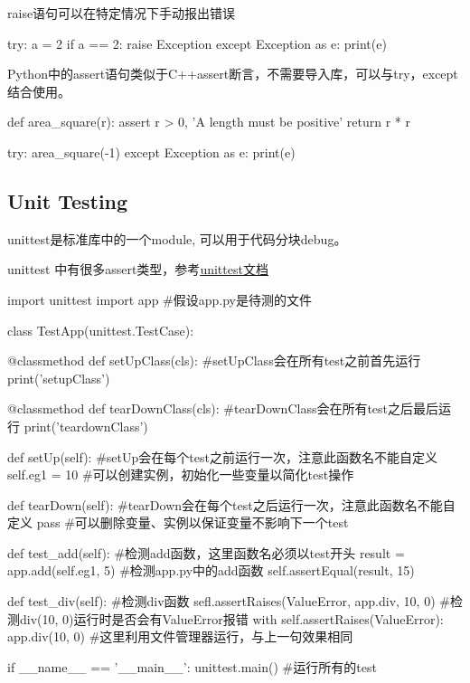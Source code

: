     raise语句可以在特定情况下手动报出错误
    \begin{codeblock}[language=python, caption={Raise an error}]
      try:
          a = 2
          if a == 2:
              raise Exception
      except Exception as e:
          print(e)
    \end{codeblock}

    Python中的assert语句类似于C++assert断言，不需要导入库，可以与try，except结合使用。
    \begin{codeblock}[language=python, caption={assert in python}]
      def area_square(r):
          assert r > 0, 'A length must be positive'
          return r * r

      try:
          area_square(-1)
      except Exception as e:
          print(e)
    \end{codeblock}

  \subsection{Unit Testing}
    unittest是标准库中的一个module, 可以用于代码分块debug。 
    
    unittest 中有很多assert类型，参考\href{https://docs.python.org/3/library/unittest.html#module-unittest}{\underline{unittest文档}}
    \begin{codeblock}[language=python, caption={Unit Testing}]
      import unittest
      import app #假设app.py是待测的文件

      class TestApp(unittest.TestCase):

          @classmethod
          def setUpClass(cls): #setUpClass会在所有test之前首先运行
              print('setupClass')

          @classmethod
          def tearDownClass(cls): #tearDownClass会在所有test之后最后运行
              print('teardownClass')

          def setUp(self): #setUp会在每个test之前运行一次，注意此函数名不能自定义
              self.eg1 = 10 #可以创建实例，初始化一些变量以简化test操作

          def tearDown(self): #tearDown会在每个test之后运行一次，注意此函数名不能自定义
              pass #可以删除变量、实例以保证变量不影响下一个test

          def test_add(self): #检测add函数，这里函数名必须以test开头
              result = app.add(self.eg1, 5) #检测app.py中的add函数
              self.assertEqual(result, 15)

          def test_div(self): #检测div函数
              sefl.assertRaises(ValueError, app.div, 10, 0)
              #检测div(10, 0)运行时是否会有ValueError报错
              with self.assertRaises(ValueError):
                  app.div(10, 0) #这里利用文件管理器运行，与上一句效果相同

      if __name__ == '__main__':
          unittest.main() #运行所有的test
    \end{codeblock}

